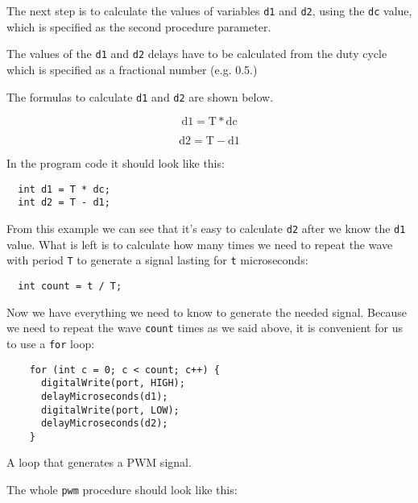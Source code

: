 \documentclass[../sparc.tex]{subfiles}
\begin{document}
The next step is to calculate the values of variables \texttt{d1} and
\texttt{d2}, using the \texttt{dc} value, which is specified as the second
procedure parameter.

The values of the \texttt{d1} and \texttt{d2} delays have to be calculated from
the duty cycle which is specified as a fractional number (e.g. 0.5.)

The formulas to calculate \texttt{d1} and \texttt{d2} are shown below.

\begin{equation}
  \mbox{d1} = \mbox{T} * \mbox{dc}
  \label{A formula to calculate the time of ``HIGH'' value.}
\end{equation}

\begin{equation}
  \mbox{d2} = \mbox{T} - \mbox{d1}
  \label{A formula to calculate the time of ``LOW value.}
\end{equation}

In the program code it should look like this:

\begin{verbatim}
  int d1 = T * dc;
  int d2 = T - d1;
\end{verbatim}

From this example we can see that it's easy to calculate \texttt{d2} after we
know the \texttt{d1} value.  What is left is to calculate how many times we need
to repeat the wave with period \texttt{T} to generate a signal lasting for
\texttt{t} microseconds:

\begin{verbatim}
  int count = t / T;
\end{verbatim}

Now we have everything we need to know to generate the needed signal.  Because
we need to repeat the wave \texttt{count} times as we said above, it is
convenient for us to use a \texttt{for} loop:

\begin{listing}[H]
  \begin{verbatim}
    for (int c = 0; c < count; c++) {
      digitalWrite(port, HIGH);
      delayMicroseconds(d1);
      digitalWrite(port, LOW);
      delayMicroseconds(d2);
    }
  \end{verbatim}
  \label{listing:pwm-cycle}
  \caption{A loop that generates a PWM signal.}
\end{listing}

The whole \texttt{pwm} procedure should look like this:
\end{document}
